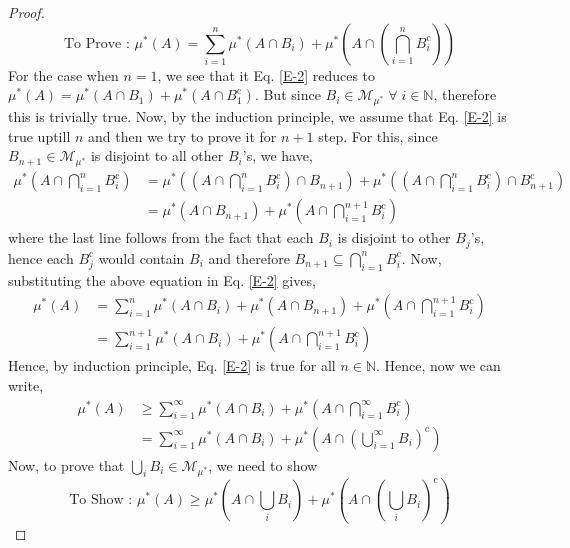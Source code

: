\documentclass{article}
\theoremstyle{definition}
\theoremstyle{remark}
\theoremstyle{definition}
\theoremstyle{definition}
\theoremstyle{definition}
\newcommand{\intrs}{\cap}
\newcommand{\bunion}{\bigcup}
\newcommand{\bintrs}{\bigcap}
\newcommand{\N}{\mathbb{N}}
\newcommand{\comp}[1]{#1^{\text{c}}}
\newcommand{\om}[1]{\mu^*\left ( #1\right )}
\newcommand{\set}[1]{\mathscr{#1}}
\newcommand{\msigm}[1]{\set{M}_{#1}}
\begin{document}
\begin{proof}
\begin{equation}\label{E-2}
	\text{To Prove : }\om{A} = \sum_{i=1}^n \om{A\intrs B_i} + \om{A\intrs \left (\bintrs_{i=1}^{n} \comp{B_i}\right )}
\end{equation}
For the case when $ n=1 $, we see that it Eq. \ref{E-2} reduces to $ \om{A} = \om{A\intrs B_1} + \om{A\intrs \comp{B_1}} $. But since $ B_i \in \msigm{\mu^*}\;\forall \;i\in \N$, therefore this is trivially true. Now, by the induction principle, we assume that Eq. \ref{E-2} is true uptill $ n $ and then we try to prove it for $ n+1 $ step. For this, since $ B_{n+1} \in \msigm{\mu^*}$ is disjoint to all other $ B_i $'s, we have,
\begin{equation*}
	\begin{split}
		\om{A\intrs \bintrs_{i=1}^n \comp{B_i}} &= \om{\left ( A\intrs \bintrs_{i=1}^n \comp{B_i} \right ) \intrs B_{n+1}} +\om{\left ( A\intrs \bintrs_{i=1}^n \comp{B_i} \right ) \intrs \comp{B_{n+1}}} \\
		&= \om{A\intrs B_{n+1}} + \om{A\intrs \bintrs_{i=1}^{n+1} \comp{B_i}}
	\end{split}
\end{equation*}
where the last line follows from the fact that each $ B_i $ is disjoint to other $ B_j $'s, hence each $ \comp{B_j} $ would contain $ B_i $ and therefore $ B_{n+1}\subseteq \bintrs_{i=1}^n \comp{B_i}  $. Now, substituting the above equation in Eq. \ref{E-2} gives,
\newpage
\begin{equation*}
	\begin{split}
		\om{A} &= \sum_{i=1}^n \om{A\intrs B_i} + \om{A\intrs B_{n+1}} + \om{A\intrs \bintrs_{i=1}^{n+1} \comp{B_i}}\\
		&= \sum_{i=1}^{n+1} \om{A\intrs B_i} + \om{A\intrs \bintrs_{i=1}^{n+1} \comp{B_i}}
	\end{split}
\end{equation*}
Hence, by induction principle, Eq. \ref{E-2} is true for all $ n\in \N $. Hence, now we can write,
\begin{equation*}
	\begin{split}
		\om{A} &\ge \sum_{i=1}^\infty \om{A\intrs B_i} + \om{A\intrs \bintrs_{i=1}^\infty \comp{B_i}}\\
		&=\sum_{i=1}^\infty \om{A\intrs B_i} + \om{A\intrs \comp{\left (\bunion_{i=1}^\infty B_i\right)}}
	\end{split}
\end{equation*}
Now, to prove that $ \bunion_i B_i \in \msigm{\mu^*}$, we need to show
\[\text{To Show : }\om{A} \ge \om{A\intrs \bunion_{i} B_i} + \om{A\intrs \comp{\left (\bunion_i B_i\right )}}\]

\end{proof}
\end{document}
